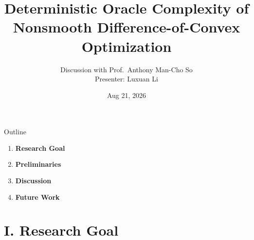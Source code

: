 \documentclass[10pt]{beamer}
\begin{document}
  

\newtheorem{thm}{Theorem}[section]   %
\newtheorem{cor}{Proposition} %
\newtheorem{pro}{Problem}   %
\newtheorem{dfn}{Definition}  %
\newtheorem{rmk}{Remark}  %
\newtheorem{prf}{Proof}   %
\newtheorem{lem}{Lemma}[section]

\newcommand{\red}[1]{{\color[rgb]{1,0,0}{#1}}}
\newcommand{\blue}[1]{{\color[rgb]{0,0,1}{#1}}}
\newcommand{\green}[1]{{\color[rgb]{0,1,0}{#1}}}
\newcommand{\cg}[1]{{\colorbox{green}{#1}}}
\newcommand{\cy}[1]{{\colorbox{yellow}{#1}}}


\title{Deterministic Oracle Complexity of Nonsmooth Difference-of-Convex Optimization} 
\author{Discussion with Prof.\ Anthony Man-Cho So \\[4pt] Presenter: Luxuan Li}
\date{Aug 21, 2026}
\maketitle

\begin{frame}{Outline}

\begin{enumerate}\setlength{\itemsep}{6pt}
    \item[\textbf{I.}] \textbf{Research Goal}\\[-1pt]


    \item[\textbf{II.}] \textbf{Preliminaries}\\[-1pt]


    \item[\textbf{III.}] \textbf{Discussion}\\[-1pt]
  

    \item[\textbf{IV.}] \textbf{Future Work}\\[-1pt]

\end{enumerate}
\end{frame}

\section{I. Research Goal}
\end{document}
